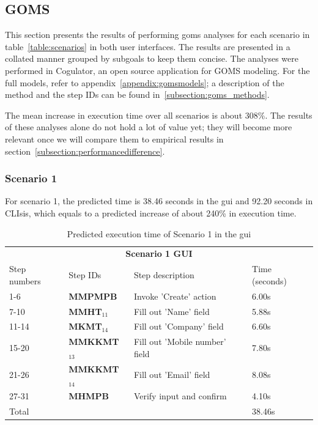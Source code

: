 \subsection{GOMS}
\label{subsection:goms_evaluation}
This section presents the results of performing \acrshort{goms} analyses for each scenario in table~\ref{table:scenarios} in both user interfaces. The results are presented in a collated manner grouped by subgoals to keep them concise. The analyses were performed in Cogulator\cite{Cogul87:online}, an open source application for GOMS modeling. For the full models, refer to appendix~\ref{appendix:gomsmodels}; a description of the method and the step IDs can be found in~\ref{subsection:goms_methods}.

The mean increase in execution time over all scenarios is about 308\%. The results of these analyses alone do not hold a lot of value yet; they will become more relevant once we will compare them to empirical results in section~\ref{subsection:performancedifference}.

\subsubsection{Scenario 1}
For scenario 1, the predicted time is 38.46 seconds in the \acrshort{gui} and 92.20 seconds in CLIsis, which equals to a predicted increase of about 240\% in execution time.

\begin{table}[H]
	\center
	
	\begin{tabular}{llll}
		\toprule
		\multicolumn{4}{c}{\textbf{Scenario 1 GUI}} \\
		\addlinespace[0.5em]
		Step numbers & Step IDs & Step description & Time (seconds) \\
		\midrule
		1-6 		& \textbf{MMPMPB} 				& Invoke 'Create' action 			& 6.00s \\
		7-10		& \textbf{MMHT$_{11}$} 		& Fill out 'Name' field		 		& 5.88s \\
		11-14	& \textbf{MKMT$_{14}$}		& Fill out 'Company' field			& 6.60s \\
		15-20	& \textbf{MMKKMT$_{13}$} 	& Fill out 'Mobile number' field	& 7.80s \\
		21-26	& \textbf{MMKKMT$_{14}$}	& Fill out 'Email' field				& 8.08s \\
		27-31	& \textbf{MHMPB}					& Verify input and confirm		& 4.10s \\
		\midrule
		\multicolumn{3}{l}{Total}																	& 38.46s\\
		\bottomrule
	\end{tabular}
	
	\caption{Predicted execution time of Scenario 1 in the \acrshort{gui}}
	\label{table:gomsscenario1gui}
\end{table}

